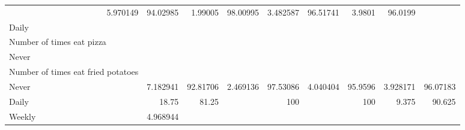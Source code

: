 \documentclass{article}
\begin{document}
\begin{table}[!h]
{\begin{tabular}{lllllllll}
				\multicolumn{1}{|r}{5.970149} &
				\multicolumn{1}{r}{94.02985} &
				\multicolumn{1}{r}{1.99005} &
				\multicolumn{1}{r}{98.00995} &
				\multicolumn{1}{r}{3.482587} &
				\multicolumn{1}{r}{96.51741} &
				\multicolumn{1}{r}{3.9801} &
				\multicolumn{1}{r}{96.0199} \\
				\multicolumn{1}{l}{\hspace{1em}Daily} &
				\multicolumn{1}{|r}{} &
				\multicolumn{1}{r}{} &
				\multicolumn{1}{r}{} &
				\multicolumn{1}{r}{} &
				\multicolumn{1}{r}{} &
				\multicolumn{1}{r}{} &
				\multicolumn{1}{r}{} &
				\multicolumn{1}{r}{} \\
				\multicolumn{1}{l}{\hspace{2em}Number of times eat pizza} &
				\multicolumn{1}{|r}{} &
				\multicolumn{1}{r}{} &
				\multicolumn{1}{r}{} &
				\multicolumn{1}{r}{} &
				\multicolumn{1}{r}{} &
				\multicolumn{1}{r}{} &
				\multicolumn{1}{r}{} &
				\multicolumn{1}{r}{} \\
				\multicolumn{1}{l}{\hspace{3em}Never} &
				\multicolumn{1}{|r}{} &
				\multicolumn{1}{r}{} &
				\multicolumn{1}{r}{} &
				\multicolumn{1}{r}{} &
				\multicolumn{1}{r}{} &
				\multicolumn{1}{r}{} &
				\multicolumn{1}{r}{} &
				\multicolumn{1}{r}{} \\
				\multicolumn{1}{l}{\hspace{4em}Number of times eat fried potatoes} &
				\multicolumn{1}{|r}{} &
				\multicolumn{1}{r}{} &
				\multicolumn{1}{r}{} &
				\multicolumn{1}{r}{} &
				\multicolumn{1}{r}{} &
				\multicolumn{1}{r}{} &
				\multicolumn{1}{r}{} &
				\multicolumn{1}{r}{} \\
				\multicolumn{1}{l}{\hspace{5em}Never} &
				\multicolumn{1}{|r}{7.182941} &
				\multicolumn{1}{r}{92.81706} &
				\multicolumn{1}{r}{2.469136} &
				\multicolumn{1}{r}{97.53086} &
				\multicolumn{1}{r}{4.040404} &
				\multicolumn{1}{r}{95.9596} &
				\multicolumn{1}{r}{3.928171} &
				\multicolumn{1}{r}{96.07183} \\
				\multicolumn{1}{l}{\hspace{5em}Daily} &
				\multicolumn{1}{|r}{18.75} &
				\multicolumn{1}{r}{81.25} &
				\multicolumn{1}{r}{} &
				\multicolumn{1}{r}{100} &
				\multicolumn{1}{r}{} &
				\multicolumn{1}{r}{100} &
				\multicolumn{1}{r}{9.375} &
				\multicolumn{1}{r}{90.625} \\
				\multicolumn{1}{l}{\hspace{5em}Weekly} &
				\multicolumn{1}{|r}{4.968944} &

\end{tabular}}
\end{table}
\end{document}
